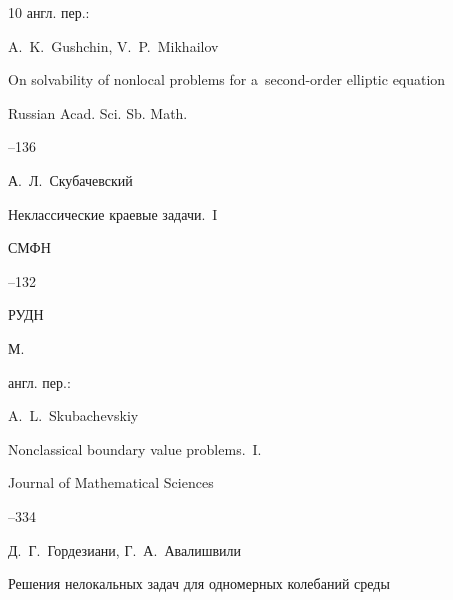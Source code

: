 \begin{thebibliography}{10}
\transl англ. пер.:~

\by 

\by A.~K.~Gushchin, V.~P.~Mikhailov

\paper On solvability of nonlocal problems for a~second-order elliptic equation

\jour Russian Acad. Sci. Sb. Math.




--136






\by А.~Л.~Скубачевский

\paper Неклассические краевые задачи.~I

\serial СМФН



--132

\publ РУДН

\publaddr М.




\transl англ. пер.:~

\by A.~L.~Skubachevskiy

\paper Nonclassical boundary value problems.~I. 

\jour Journal of Mathematical Sciences




--334





\by Д.~Г.~Гордезиани, Г.~А.~Авалишвили

\paper Решения нелокальных задач для одномерных колебаний среды


\end{thebibliography}
